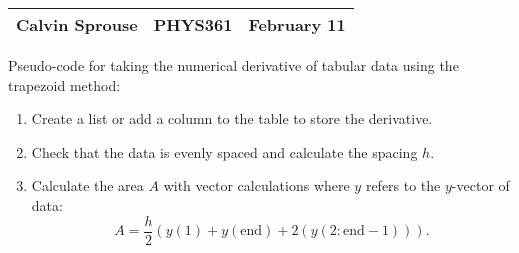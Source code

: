 \documentclass[a4paper, 12pt]{config/homework}
\begin{document}
\noindent
\begin{tabularx}{\textwidth}{>{\centering\arraybackslash}X>{\centering\arraybackslash}X>{\centering\arraybackslash}X}
Calvin Sprouse & PHYS361 & 2024 February 11\\
\midrule
\end{tabularx}

\noindent
Pseudo-code for taking the numerical derivative of tabular data using the trapezoid method:
\begin{enumerate}
\item Create a list or add a column to the table to store the derivative.
\item Check that the data is evenly spaced and calculate the spacing \(h\).
\item Calculate the area \(A\) with vector calculations where \(y\) refers to the \(y\)-vector of data:
\[A = \frac{h}{2}\left( y(1) + y(\text{end}) + 2\left(y(2:\text{end}-1)\right) \right).\]
\end{enumerate}
\end{document}
